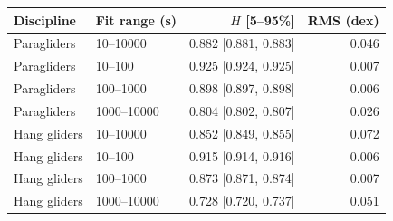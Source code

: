 \begin{tabular}{llrr}
\toprule
Discipline & Fit range (s) & $H$ [5--95\%] & RMS (dex)\\
\midrule
Paragliders & 10--10000 & 0.882 [0.881, 0.883] & 0.046\\
Paragliders & 10--100 & 0.925 [0.924, 0.925] & 0.007\\
Paragliders & 100--1000 & 0.898 [0.897, 0.898] & 0.006\\
Paragliders & 1000--10000 & 0.804 [0.802, 0.807] & 0.026\\
Hang gliders & 10--10000 & 0.852 [0.849, 0.855] & 0.072\\
Hang gliders & 10--100 & 0.915 [0.914, 0.916] & 0.006\\
Hang gliders & 100--1000 & 0.873 [0.871, 0.874] & 0.007\\
Hang gliders & 1000--10000 & 0.728 [0.720, 0.737] & 0.051\\
\bottomrule
\end{tabular}
